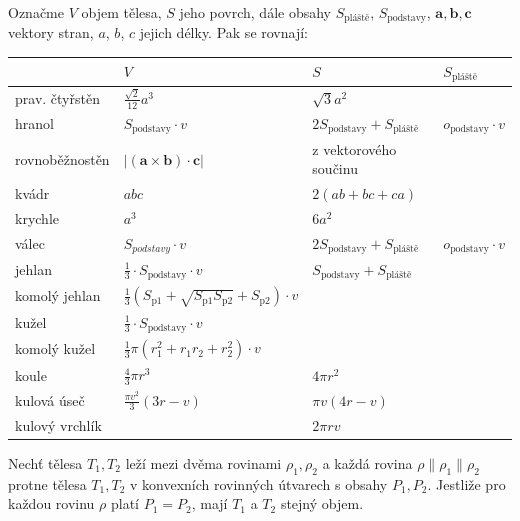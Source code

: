 \begin{veta}
  Označme $V$ objem tělesa, $S$ jeho povrch, dále obsahy $S_{\textrm{pláště}}$, $S_{\textrm{podstavy}}$, $\mathbf{a},\mathbf{b},\mathbf{c}$ vektory stran, $a$, $b$, $c$ jejich délky. Pak se rovnají:

  \begin{center}
   \footnotesize
    \begin{tabularx}{\textwidth}{ l | l  l  l }

      \, & $V$ & $S$ & $S_{\text{pláště}}$ \\
      \hline
      prav. čtyřstěn & $\frac{\sqrt{2}}{12}a^3$ & $\sqrt{3}a^2$ & \\
      hranol & $S_{\textrm{podstavy}} \cdot v$ & $2S_{\textrm{podstavy}}+S_{\textrm{pláště}}$ & $o_{\textrm{podstavy}} \cdot v$ \\
      rovnoběžnostěn & $| ( \mathbf{a} \times \mathbf{b} ) \cdot \mathbf{c} | $ & \textrm{z vektorového součinu} & \, \\
      kvádr & $abc$ & $2(ab+bc+ca)$ & \, \\
      krychle & $a^3$ & $6a^2$ & \, \\
      válec & $S_{podstavy}\cdot v$ & $2S_{\textrm{podstavy}} + S_{\textrm{pláště}}$ & $o_{\textrm{podstavy}} \cdot v$ \\
      jehlan & $\frac{1}{3}\cdot S_{\textrm{podstavy}}\cdot v$ & $S_{\textrm{podstavy}} + S_{\textrm{pláště}}$ & \, \\
      komolý jehlan & $\frac{1}{3}(S_{\textrm{p1}} + \sqrt{S_{\textrm{p1}} S_{\textrm{p2}}} + S_{\textrm{p2}})\cdot v$ & \, & \,\\
      kužel & $\frac{1}{3}\cdot S_{\textrm{podstavy}}\cdot v$ & \, & \, \\
      komolý kužel & $\frac{1}{3}\pi(r_1^2 + r_1r_2 + r_2^2)\cdot v$ & \, & \,\\
      koule & $\frac{4}{3}\pi r^3$ & $4\pi r^2$ & \, \\
      kulová úseč & $\frac{\pi v^2}{3}(3r-v)$ & $\pi v (4r-v)$ & \, \\
      kulový vrchlík & \, & $2\pi r v$ & \,
    \end{tabularx}
  \end{center}
  \normalsize
\end{veta}

\begin{veta}
    Nechť tělesa $T_1, T_2$ leží mezi dvěma rovinami $\rho_1, \rho_2$ a každá rovina
    $\rho \parallel \rho_1\parallel \rho_2$ protne tělesa $T_1, T_2$ v konvexních
    rovinných útvarech s obsahy $P_1, P_2.$ Jestliže pro každou rovinu $\rho$ platí
    $P_1=P_2$, mají $T_1$ a $T_2$ stejný objem.
\end{veta}

